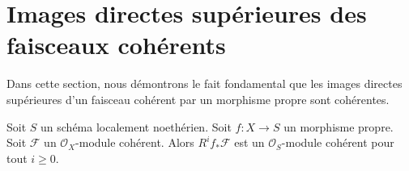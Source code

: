 \section{Images directes supérieures des faisceaux cohérents}
\label{section-proper-pushforward}

\noindent
Dans cette section, nous démontrons le fait fondamental que les images
directes supérieures d'un faisceau cohérent par un morphisme propre
sont cohérentes.

\begin{proposition}
\label{proposition-proper-pushforward-coherent}
\begin{reference}
\cite[III théorème 3.2.1]{EGA}
\end{reference}
Soit $S$ un schéma localement noethérien.
Soit $f : X \to S$ un morphisme propre.
Soit $\mathcal{F}$ un $\mathcal{O}_X$-module cohérent.
Alors $R^if_*\mathcal{F}$ est un $\mathcal{O}_S$-module
cohérent pour tout $i \geq 0$.
\end{proposition}


